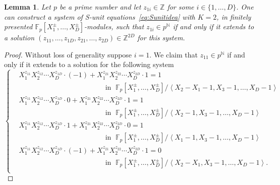 \documentclass[letterpaper, 11pt, thm-restate]{article}
\numberwithin{equation}{section}
\newcommand{\Z}{\mathbb{Z}}
\newcommand{\N}{\mathbb{N}}
\newcommand{\F}{\mathbb{F}}
\newcommand{\gen}[1]{\left\langle {#1} \right\rangle}
\newtheorem{lem}[thrm]{Lemma}
\theoremstyle{definition}
\theoremstyle{definition}
\theoremstyle{definition}
\begin{document}
\begin{lem}\label{lem:pnsys}
    Let $p$ be a prime number and let $z_{1i} \in \Z$ for some $i \in \{1, \ldots, D\}$.
    One can construct a system of S-unit equations~\eqref{eq:Sunitidea} with $K=2$, in finitely presented $\F_p[X_1^{\pm}, \ldots, X_D^{\pm}]$-modules, such that $z_{1i} \in p^{\N}$ if and only if it extends to a solution $(z_{11}, \ldots, z_{1D}, z_{21}, \ldots, z_{2D}) \in \Z^{2D}$ for this system.
\end{lem}
\begin{proof}
    Without loss of generality suppose $i = 1$.
    We claim that $z_{11} \in p^{\N}$ if and only if it extends to a solution for the following system
    \begin{equation}\label{eq:syspn}
    \begin{cases}
        & X_1^{z_{11}} X_2^{z_{12}} \cdots X_D^{z_{1D}} \cdot (-1) + X_1^{z_{21}} X_2^{z_{22}} \cdots X_D^{z_{2D}} \cdot 1 = 1 \\ & \hspace{5cm} \text{ in }\; \F_p[X_1^{\pm}, \ldots, X_D^{\pm}]/\gen{X_2 - X_1 - 1, X_3 - 1, \ldots, X_D - 1} \\
        & X_1^{z_{11}} X_2^{z_{12}} \cdots X_D^{z_{1D}} \cdot 0 + X_1^{z_{21}} X_2^{z_{22}} \cdots X_D^{z_{2D}} \cdot 1 = 1 \\ & \hspace{5cm} \text{ in }\; \F_p[X_1^{\pm}, \ldots, X_D^{\pm}]/\gen{X_2 - 1, X_3 - 1, \ldots, X_D - 1} \\
        & X_1^{z_{11}} X_2^{z_{12}} \cdots X_D^{z_{1D}} \cdot 1 + X_1^{z_{21}} X_2^{z_{22}} \cdots X_D^{z_{2D}} \cdot 0 = 1 \\ & \hspace{5cm} \text{ in }\; \F_p[X_1^{\pm}, \ldots, X_D^{\pm}]/\gen{X_1 - 1, X_3 - 1, \ldots, X_D - 1} \\
        & X_1^{z_{11}} X_2^{z_{12}} \cdots X_D^{z_{1D}} \cdot (-1) + X_1^{z_{21}} X_2^{z_{22}} \cdots X_D^{z_{2D}} \cdot 1 = 0 \\ & \hspace{5cm} \text{ in }\; \F_p[X_1^{\pm}, \ldots, X_D^{\pm}]/\gen{X_2 - X_1, X_3 - 1, \ldots, X_D - 1}. \\
    \end{cases}
    \end{equation}
    

\end{proof}
\end{document}
